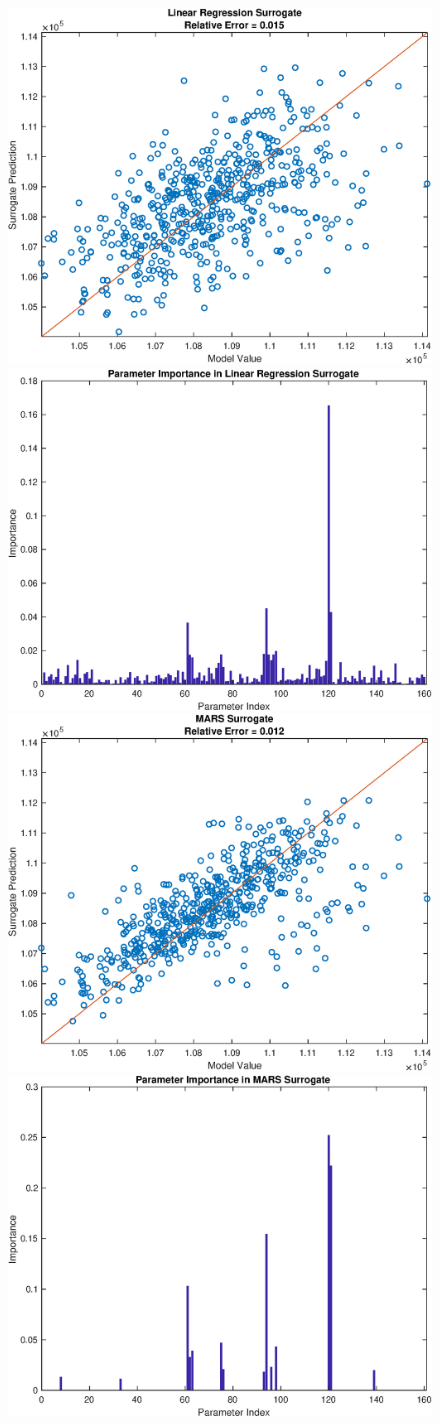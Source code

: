 \documentclass[12pt]{article}
\numberwithin{equation}{section}
\begin{document}
\begin{figure}[h]
\centering
\includegraphics[width=.49 \textwidth]{Figures/K_AC_Max_QoI_LR_Prediction_Experimental.eps}
\includegraphics[width=.49 \textwidth]{Figures/K_AC_Max_QoI_LR_VI_Experimental.eps}\\
\includegraphics[width=.49 \textwidth]{Figures/K_AC_Max_QoI_MARS_Prediction_Experimental.eps}
\includegraphics[width=.49 \textwidth]{Figures/K_AC_Max_QoI_MARS_VI_Experimental.eps}
\end{figure}
\end{document}

